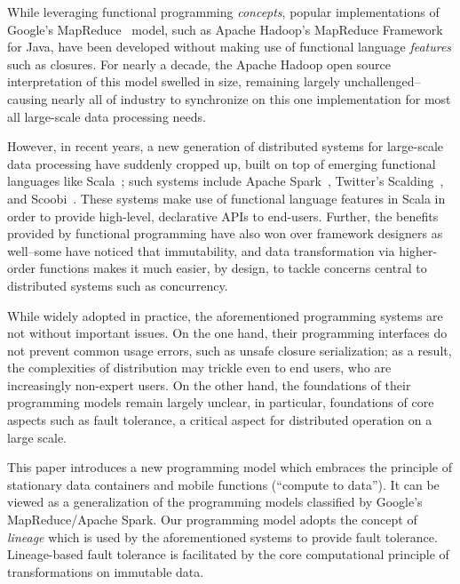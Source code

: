 \documentclass{jfp1}
\begin{document}
While leveraging functional programming {\em concepts}, popular implementations
of \\Google's MapReduce~\cite{MapReduce} model, such as Apache Hadoop's MapReduce
Framework~\cite{Hadoop} for Java, have been developed without making use of
functional language {\em features} such as closures. For nearly a decade, the
Apache Hadoop open source interpretation of this model swelled in size,
remaining largely unchallenged--causing nearly all of industry to synchronize on
this one implementation for most all large-scale data processing needs.

However, in recent years, a new generation of distributed systems for
large-scale data processing have suddenly cropped up, built on top of emerging
functional languages like Scala~\cite{Odersky10}; such systems include Apache
Spark~\cite{Spark}, Twitter's Scalding~\cite{Scalding}, and
Scoobi~\cite{Scoobi}. These systems make use of functional language features in
Scala in order to provide high-level, declarative APIs to end-users. Further,
the benefits provided by functional programming have also won over framework
designers as well--some have noticed that immutability, and data transformation
via higher-order functions makes it much easier, by design, to tackle concerns
central to distributed systems such as concurrency.

While widely adopted in practice, the aforementioned programming systems are not
without important issues. On the one hand, their programming interfaces do not
prevent common usage errors, such as unsafe closure serialization; as a result,
the complexities of distribution may trickle even to end users, who are
increasingly non-expert users. On the other hand, the foundations of their
programming models remain largely unclear, in particular, foundations of core
aspects such as fault tolerance, a critical aspect for distributed operation on
a large scale.

This paper introduces a new programming model which embraces the principle of
stationary data containers and mobile functions (``compute to data''). It can be viewed as
a generalization of the programming models classified by Google's
MapReduce/Apache Spark. Our programming model adopts the concept of {\em
lineage} which is used by the aforementioned systems to provide fault tolerance.
Lineage-based fault tolerance is facilitated by the core computational principle
of transformations on immutable data.
\end{document}

